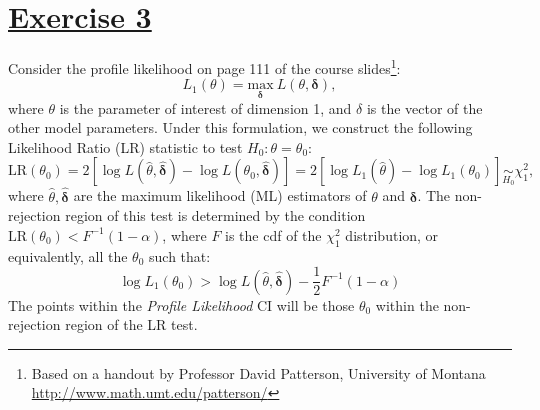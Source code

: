 \documentclass[a4paper,12pt]{article}\usepackage[]{graphicx}\usepackage[]{color}
\def\bbeta{\mbox{\boldmath $\beta$}}
\def\op{\left(}
\def\cp{\right)}
\def\oc{\left[}
\def\cc{\right]}
\begin{document}
\section{\underline{Exercise 3}}



Consider the profile likelihood on page 111 of the course slides\footnote{Based on a handout by Professor David Patterson, University of Montana \url{http://www.math.umt.edu/patterson/}}: 
%
\begin{equation*}
    L_1\op\theta\cp = \underset{\mathbf{\delta}}{\mathrm{max}} \ L\op\theta, \mathbf{\delta} \cp, 
\end{equation*}
%
where $\theta$ is the parameter of interest of dimension 1, and $\delta$ is the
vector of the other model parameters. Under this formulation, we construct the following Likelihood
Ratio (LR) statistic to test $H_0 : \theta = \theta_0$: 
%
\begin{equation*}
    \mathrm{LR}\op \theta_0\cp = 
    2\oc \log L\op \widehat{\theta} , \widehat{\mathbf{\delta}}\cp - \log L\op \theta_0 , \widehat{\mathbf{\delta}}\cp\cc = 
    2 \oc \log L_1\op\widehat{\theta}\cp - \log L_1\op\theta_0\cp \cc \underset{H_0}{\sim}\chi^2_1,
\end{equation*}
%
where $\widehat{\theta}, \widehat{\mathbf{\delta}}$ are the maximum likelihood
(ML) estimators of $\theta$ and $\mathbf{\delta}$. The non-rejection region of
this test is determined by the condition $\mathrm{LR}\op\theta_0\cp < F^{-1}\op
1-\alpha\cp$, where $F$ is the cdf of the $\chi^2_1$ distribution, or
equivalently, all the $\theta_0$ such that: 
%
\begin{equation} \label{eq:nonrejection}
    \log L_1\op \theta_0\cp > \log L\op\widehat{\theta},\widehat{\mathbf{\delta}}\cp - \frac{1}{2}F^{-1}\op 1-\alpha\cp
\end{equation}
%
The points within the \emph{Profile Likelihood} CI will be those $\theta_0$ within the non-rejection region of the LR test.
\end{document}
